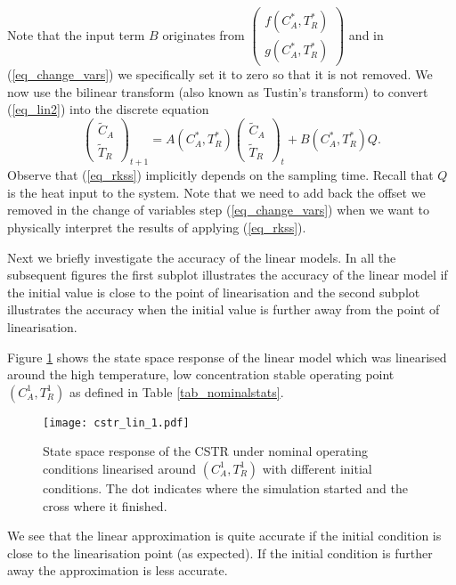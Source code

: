 Note that the input term $B$ originates from $\begin{pmatrix}
f(C_A^*, T_R^*) \\ g(C_A^*, T_R^*)
\end{pmatrix}$ and in (\ref{eq_change_vars}) we specifically set it to zero so that it is not removed. We now use the bilinear transform (also known as Tustin's transform) to convert (\ref{eq_lin2}) into the discrete equation
\begin{equation}
\begin{pmatrix}
\tilde{C}_A \\ \tilde{T}_R
\end{pmatrix}_{t+1} = A(C_A^*, T_R^*) \begin{pmatrix}
\tilde{C}_A \\ \tilde{T}_R
\end{pmatrix}_{t} + B(C_A^*, T_R^*)Q. 
\label{eq_rkss}
\end{equation}
Observe that (\ref{eq_rkss}) implicitly depends on the sampling time. Recall that $Q$ is the heat input to the system. Note that we need to add back the offset we removed in the change of variables step (\ref{eq_change_vars}) when we want to physically interpret the results of applying (\ref{eq_rkss}).

Next we briefly investigate the accuracy of the linear models. In all the subsequent figures the first subplot illustrates the accuracy of the linear model if the initial value is close to the point of linearisation and the second subplot illustrates the accuracy when the initial value is further away from the point of linearisation.

Figure \ref{fig_cstr_lin_1} shows the state space response of the linear model which was linearised around the high temperature, low concentration stable operating point $(C_A^1,T_R^1)$ as defined in Table \ref{tab_nominalstats}.
\begin{figure}[H] 
\centering
\texttt{[image: cstr\_lin\_1.pdf]}
\caption{State space response of the CSTR under nominal operating conditions linearised around $(C_A^1,T_R^1)$ with different initial conditions. The dot indicates where the simulation started and the cross where it finished.}
\label{fig_cstr_lin_1}
\end{figure}
We see that the linear approximation is quite accurate if the initial condition is close to the linearisation point (as expected). If the initial condition is further away the approximation is less accurate.


